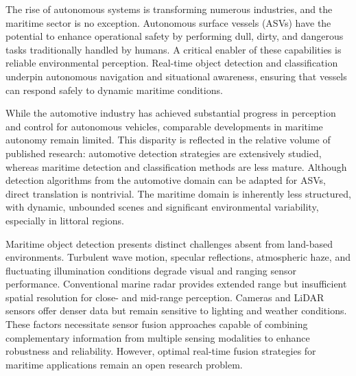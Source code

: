 \documentclass{erauthesis}
\begin{document}

The rise of autonomous systems is transforming numerous industries, and the maritime sector is no exception. 
Autonomous surface vessels (ASVs) have the potential to enhance operational safety by performing dull, dirty, and dangerous tasks traditionally handled by humans. 
A critical enabler of these capabilities is reliable environmental perception. Real-time object detection and classification underpin autonomous navigation and situational awareness, ensuring that vessels can respond safely to dynamic maritime conditions.

While the automotive industry has achieved substantial progress in perception and control for autonomous vehicles, comparable developments in maritime autonomy remain limited. 
This disparity is reflected in the relative volume of published research: automotive detection strategies are extensively studied, whereas maritime detection and classification methods are less mature. 
Although detection algorithms from the automotive domain can be adapted for ASVs, direct translation is nontrivial. 
The maritime domain is inherently less structured, with dynamic, unbounded scenes and significant environmental variability, especially in littoral regions.

Maritime object detection presents distinct challenges absent from land-based environments. 
Turbulent wave motion, specular reflections, atmospheric haze, and fluctuating illumination conditions degrade visual and ranging sensor performance. 
Conventional marine radar provides extended range but insufficient spatial resolution for close- and mid-range perception. 
Cameras and LiDAR sensors offer denser data but remain sensitive to lighting and weather conditions. 
These factors necessitate sensor fusion approaches capable of combining complementary information from multiple sensing modalities to enhance robustness and reliability. 
However, optimal real-time fusion strategies for maritime applications remain an open research problem.
\end{document}

